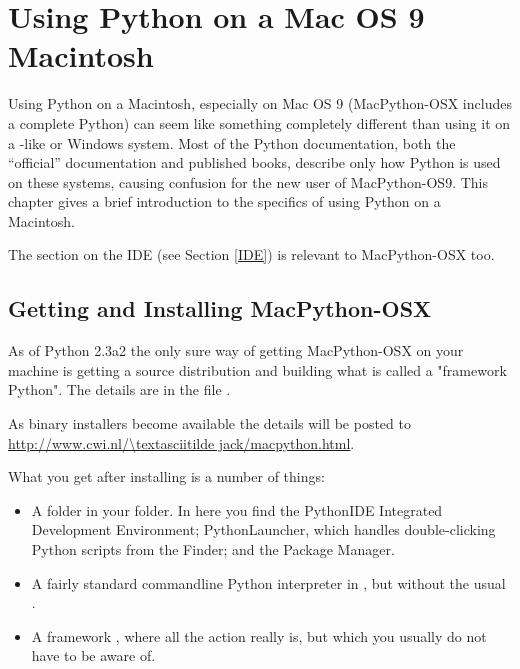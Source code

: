 \chapter{Using Python on a Mac OS 9 Macintosh \label{using}}

Using Python on a Macintosh, especially on Mac OS 9 (MacPython-OSX
includes a complete \UNIX{} Python) can seem like something completely
different than using it on a \UNIX-like or Windows system. Most of the
Python documentation, both the ``official'' documentation and published
books, describe only how Python is used on these systems, causing
confusion for the new user of MacPython-OS9. This chapter gives a brief
introduction to the specifics of using Python on a Macintosh.


The section on the IDE (see Section \ref{IDE}) is relevant to MacPython-OSX
too.

\section{Getting and Installing MacPython-OSX \label{getting-OSX}}

As of Python 2.3a2 the only sure way of getting MacPython-OSX on your machine
is getting a source distribution and building what is called a "framework Python".
The details are in the file .

As binary installers become available the details will be posted to
\url{http://www.cwi.nl/\textasciitilde jack/macpython.html}.


What you get after installing is a number of things:

\begin{itemize}
    \item A  folder in your 
    folder. In here you find the PythonIDE Integrated Development Environment;
    PythonLauncher, which handles double-clicking Python scripts from
    the Finder; and the Package Manager.
    
    \item A fairly standard \UNIX{} commandline Python interpreter in
    , but without the usual
    .
    
    \item A framework , where
    all the action really is, but which you usually do not have to be aware of.
\end{itemize}

